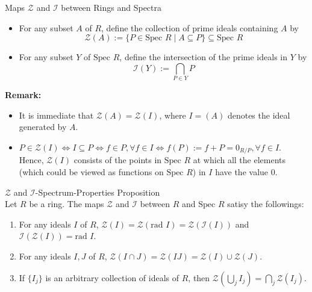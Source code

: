 \begin{definition}{Maps $\mathcal{Z}$ and $\mathcal{I}$ between Rings and Spectra}\\
\begin{itemize}
    \item For any subset $A$ of $R$, define the collection of prime ideals containing $A$ by
    $$\mathcal{Z} (A):= \{P \in \text{Spec }R \mid A\subseteq P\} \subseteq \text{Spec }R$$

    \item For any subset $Y$ of $\text{Spec } R$, define the intersection of the prime ideals in $Y$ by
    $$\mathcal{I} (Y):= \bigcap_{P \in Y} P$$
\end{itemize}
\end{definition}

\noindent\textbf{Remark:} \begin{itemize}
    \item It is immediate that $\mathcal{Z} (A)= \mathcal{Z} (I)$, where $I=(A)$ denotes the ideal generated by $A$.
    \item $P \in \mathcal{Z} (I) \Leftrightarrow I \subseteq P \Leftrightarrow f\in P,\forall f\in I \Leftrightarrow f(P):= f+P=0_{R/P} ,\forall f\in I.$\\
    Hence, $\mathcal{Z} (I)$ consists of the points in $\text{Spec }R$ at which all the elements (which could be viewed as functions on $\text{Spec }R$) in $I$ have the value $0$.
\end{itemize}

\begin{proposition}{$\mathcal{Z}$ and $\mathcal{I}$-Spectrum-Properties Proposition}\\
Let $R$ be a ring. The maps $\mathcal{Z}$ and $\mathcal{I}$ between $R$ and $\text{Spec }R$ satisy the followings:
\begin{enumerate}
    \item For any ideals $I$ of $R$, $\mathcal{Z} (I) =\mathcal{Z} (\text{rad }I)= \mathcal{Z} (\mathcal{I} (I))$ and $\mathcal{I} (\mathcal{Z} (I)) =\text{rad }I$.
    \item For any ideals $I,J$ of $R$, $\mathcal{Z} (I \cap J) =\mathcal{Z} (IJ) = \mathcal{Z} (I) \cup \mathcal{Z} (J)$.
    \item If $\{I_j\}$ is an arbitrary collection of ideals of $R$, then $\mathcal{Z} (\bigcup_{j} I_j) = \bigcap_{j} \mathcal{Z} (I_j)$.
\end{enumerate}
\end{proposition}

